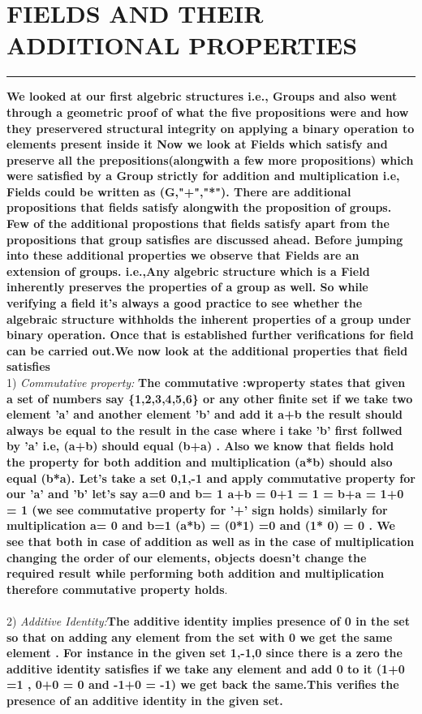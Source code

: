 \documentclass{article}
\begin{document}
\section * {FIELDS AND THEIR ADDITIONAL PROPERTIES}
\hrule 
\bigskip
\textbf{We looked at our first algebric structures i.e., Groups and also went through a geometric proof of what the five propositions  were and how they preservered structural integrity on applying a binary operation to elements present inside it
Now we look at Fields which satisfy and preserve all the prepositions(alongwith a few more propositions) which were satisfied by a Group strictly for addition and multiplication i.e, Fields could be written as  (G,"+","*"). There are additional  propositions that fields satisfy alongwith the proposition of groups. Few of the additional propostions that fields satisfy apart from the propositions that group satisfies are discussed ahead.
Before jumping into these additional properties we observe that Fields are an extension of groups. i.e.,Any algebric structure which is a Field inherently preserves the properties of a group as well. So while verifying a field it's always a good practice to see whether the algebraic structure withholds the inherent properties of a group under binary operation. Once that is established further verifications for field can be carried out.We now look at the additional properties that field satisfies
}
\\
1) \textit{Commutative property:\quad}\textbf{ The commutative :wproperty states that given a set of numbers say \{1,2,3,4,5,6\} or any other finite set  if we take two element 'a' and another element 'b' and add it a+b the result should always be equal to the result in the case where i take 'b' first follwed by 'a' i.e, (a+b) should equal (b+a) . Also we know that fields hold the property for both addition and multiplication (a*b) should also equal (b*a).
    Let's take a set {0,1,-1} and apply commutative property for our 'a' and 'b' let's say a=0 and b= 1 a+b = 0+1 = 1 = b+a = 1+0 = 1 (we see commutative property for '+' sign holds) similarly for multiplication a= 0 and b=1 (a*b) = (0*1) =0 and (1* 0) = 0 . We see that both in case of addition as well as in the case of multiplication changing the order of our elements, objects doesn't change the required result 
while performing both addition and multiplication therefore commutative property holds}.
\\
\\
2) \textit{Additive Identity:\quad}\textbf{The additive identity implies presence of 0 in the set  so that on adding any element from the set with 0 we get the same element . For instance in the given set {1,-1,0} since there is a zero the additive identity satisfies if we take any element and add 0 to it (1+0 =1 , 0+0 = 0 and -1+0 = -1) we get back the same.This verifies the presence of  an additive identity in the given set.}
\end{document}
